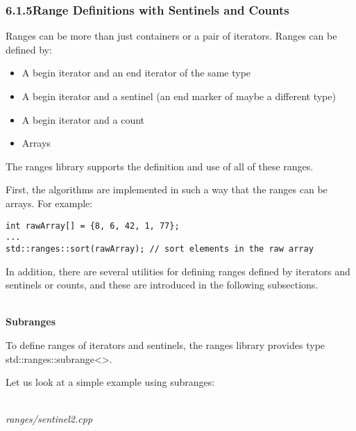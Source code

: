 \subsubsection*{ 6.1.5\hspace{0.2cm}Range Definitions with Sentinels and Counts}

Ranges can be more than just containers or a pair of iterators. Ranges can be defined by:

\begin{itemize}
\item
A begin iterator and an end iterator of the same type

\item
A begin iterator and a sentinel (an end marker of maybe a different type)

\item
A begin iterator and a count

\item
Arrays
\end{itemize}

The ranges library supports the definition and use of all of these ranges.

First, the algorithms are implemented in such a way that the ranges can be arrays. For example:

\begin{lstlisting}[style=styleCXX]
int rawArray[] = {8, 6, 42, 1, 77};
...
std::ranges::sort(rawArray); // sort elements in the raw array
\end{lstlisting}

In addition, there are several utilities for defining ranges defined by iterators and sentinels or counts, and these are introduced in the following subsections.

\noindent
\hspace*{\fill} \\ %
\textbf{Subranges}

To define ranges of iterators and sentinels, the ranges library provides type std::ranges::subrange<>.

Let us look at a simple example using subranges:

\noindent
\hspace*{\fill} \\ %
\textit{ranges/sentinel2.cpp}

